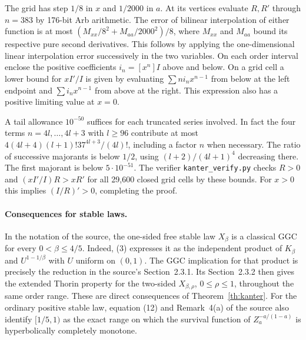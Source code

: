 \documentclass[11pt,a4paper]{article}
\numberwithin{equation}{section}
\begin{document}
The grid has step $1/8$ in $x$ and $1/2000$ in $a$. At its vertices
evaluate $R,R'$ through $n=383$ by 176-bit Arb arithmetic.
The error of bilinear interpolation of either function is at most
$(M_{xx}/8^2+M_{aa}/2000^2)/8$, where $M_{xx}$ and $M_{aa}$ bound
its respective pure second derivatives. This follows by applying the
one-dimensional linear interpolation error successively in the two
variables. On each order interval enclose the positive coefficients
$i_n=[x^n]I$ above and below. On a grid cell a lower bound for
$xI'/I$ is given by evaluating $\sum n i_n x^{n-1}$ from below at
the left endpoint and $\sum i_n x^{n-1}$ from above at the right.
This expression also has a positive limiting value at $x=0$.

A tail allowance $10^{-50}$ suffices for each truncated series involved.
In fact the four terms $n=4l,\ldots,4l+3$ with $l\ge96$ contribute
at most $4(4l+4)(l+1)!37^{4l+3}/(4l)!$, including a factor $n$
when necessary. The ratio of successive majorants is below $1/2$,
using $(l+2)/(4l+1)^4$ decreasing there. The first majorant is below
$5\cdot10^{-51}$. The verifier \texttt{kanter\_verify.py} checks
$R>0$ and $(x I'/I)R>xR'$ for all 29,600 closed grid cells by these
bounds. For $x>0$ this implies $(I/R)'>0$, completing the proof.

\paragraph{Consequences for stable laws.}
In the notation of the source, the one-sided free stable law
$X_\beta$ is a classical GGC for every $0<\beta\le4/5$. Indeed,
(3) expresses it as the independent product of $K_\beta$ and
$U^{1-1/\beta}$ with $U$ uniform on $(0,1)$. The GGC implication
for that product is precisely the reduction in the source's
Section~2.3.1. Its Section~2.3.2 then gives the extended Thorin
property for the two-sided $X_{\beta,\rho}$, $0\le\rho\le1$, throughout
the same order range. These are direct consequences of
Theorem~\ref{th:kanter}. For the ordinary positive stable law,
equation (12) and Remark~4(a) of the source also identify $[1/5,1)$
as the exact range on which the survival function of
$Z_a^{-a/(1-a)}$ is hyperbolically completely monotone.
\end{document}
